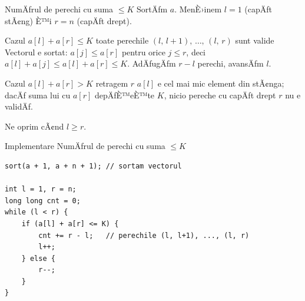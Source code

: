 ﻿\documentclass{beamer}
\begin{document}
\begin{frame}{NumÄƒrul de perechi cu suma $\leq K$}
  SortÄƒm $a$. MenÈ›inem $l = 1$ (capÄƒt stÃ¢ng) È™i $r = n$ (capÄƒt drept).

  \begin{block}{Cazul $a[l]+a[r] \leq K$ \textemdash{} toate perechile $(l,\,l{+}1),\,\ldots,\,(l,\,r)$ sunt valide}
    Vectorul e sortat: $a[j] \leq a[r]$ pentru orice $j \leq r$, deci
    $a[l]+a[j] \leq a[l]+a[r] \leq K$.
    AdÄƒugÄƒm $r-l$ perechi, avansÄƒm $l$.
  \end{block}

  \begin{block}{Cazul $a[l]+a[r] > K$ \textemdash{} retragem $r$}
    $a[l]$ e cel mai mic element din stÃ¢nga; dacÄƒ suma lui cu $a[r]$
    depÄƒÈ™eÈ™te $K$, nicio pereche cu capÄƒt drept $r$ nu e validÄƒ.
  \end{block}

  Ne oprim cÃ¢nd $l \geq r$.
\end{frame}

\begin{frame}[fragile]{Implementare \textemdash{} NumÄƒrul de perechi cu suma $\leq K$}
  \begin{lstlisting}
sort(a + 1, a + n + 1); // sortam vectorul

int l = 1, r = n;
long long cnt = 0;
while (l < r) {
    if (a[l] + a[r] <= K) {
        cnt += r - l;   // perechile (l, l+1), ..., (l, r)
        l++;
    } else {
        r--;
    }
}
  \end{lstlisting}
\end{frame}

\end{document}
